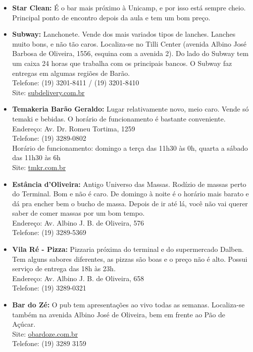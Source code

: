 \begin{itemize}
    \item   \textbf{Star Clean:} É o bar mais próximo à Unicamp, e por isso está
        sempre cheio. Principal ponto de encontro depois da aula e tem um bom
        preço.

    \item   \textbf{Subway:} Lanchonete. Vende dos mais variados tipos de
        lanches.  Lanches muito bons, e não tão caros. Localiza-se no Tilli
        Center (avenida Albino José Barbosa de Oliveira, 1556, esquina com a
        avenida 2). Do lado do Subway tem um caixa 24 horas que trabalha com os
        principais bancos. O Subway faz entregas em algumas regiões de Barão.
        \\Telefone: (19) 3201-8411 / (19) 3201-8410
        \\Site: \url{subdelivery.com.br}

      \item \textbf{Temakeria Barão Geraldo:} Lugar relativamente novo, meio
        caro. Vende só temaki e bebidas. O horário de funcionamento é bastante
        conveniente.  
        \\Endereço: Av. Dr. Romeu Tortima, 1259 
        \\Telefone: (19) 3289-0802 
        \\Horário de funcionamento: domingo a terça das 11h30 às 0h, quarta a
        sábado das 11h30 às 6h 
        \\Site: \url{tmkr.com.br}

    \item   \textbf{Estância d'Oliveira:} Antigo Universo das Massas. Rodízio de
        massas perto do Terminal. Bom e não é caro. De domingo à noite é o
        horário mais barato e dá pra encher bem o bucho de massa. Depois de ir
        até lá, você não vai querer saber de comer massas por um bom tempo.
        \\Endereço: Av. Albino J. B. de Oliveira, 576
        \\Telefone: (19) 3289-5369 

    \item   \textbf{Vila Ré - Pizza:} Pizzaria próxima do terminal e do
        supermercado Dalben. Tem alguns sabores diferentes, as pizzas são boas e
        o preço não é alto. Possui serviço de entrega das 18h às 23h.
        \\Endereço: Av. Albino J. B. de Oliveira, 658
        \\Telefone: (19) 3289-0321

    \item   \textbf{Bar do Zé:} O pub tem apresentações ao vivo todas as
        semanas.  Localiza-se também na avenida Albino José de Oliveira, bem em
        frente ao Pão de Açúcar.
        \\Site: \url{obardoze.com.br}
        \\Telefone: (19) 3289 3159


\end{itemize}
